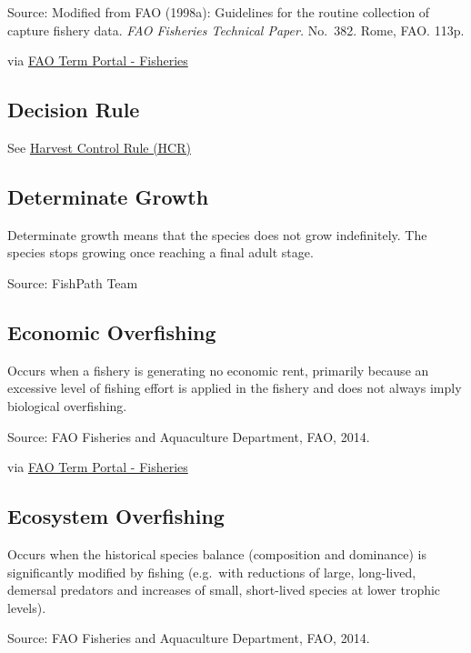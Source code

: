 \documentclass[
  11pt,
]{book}
\begin{document}
Source: Modified from FAO (1998a): Guidelines for the routine collection of capture fishery data. \emph{FAO Fisheries Technical Paper.} No.~382. Rome, FAO. 113p.

via \href{http://www.fao.org/fishery/glossary/en}{FAO Term Portal - Fisheries}

\hypertarget{decision-rule}{%
\subsection{Decision Rule}\label{decision-rule}}

See \protect\hyperlink{harvest-control-rule-hcr}{Harvest Control Rule (HCR)}

\hypertarget{determinate-growth}{%
\subsection{Determinate Growth}\label{determinate-growth}}

Determinate growth means that the species does not grow indefinitely. The species stops growing once reaching a final adult stage.

Source: FishPath Team

\hypertarget{economic-overfishing}{%
\subsection{Economic Overfishing}\label{economic-overfishing}}

Occurs when a fishery is generating no economic rent, primarily because an excessive level of fishing effort is applied in the fishery and does not always imply biological overfishing.

Source: FAO Fisheries and Aquaculture Department, FAO, 2014.

via \href{http://www.fao.org/fishery/glossary/en}{FAO Term Portal - Fisheries}

\hypertarget{ecosystem-overfishing}{%
\subsection{Ecosystem Overfishing}\label{ecosystem-overfishing}}

Occurs when the historical species balance (composition and dominance) is significantly modified by fishing (e.g.~with reductions of large, long-lived, demersal predators and increases of small, short-lived species at lower trophic levels).

Source: FAO Fisheries and Aquaculture Department, FAO, 2014.
\end{document}
